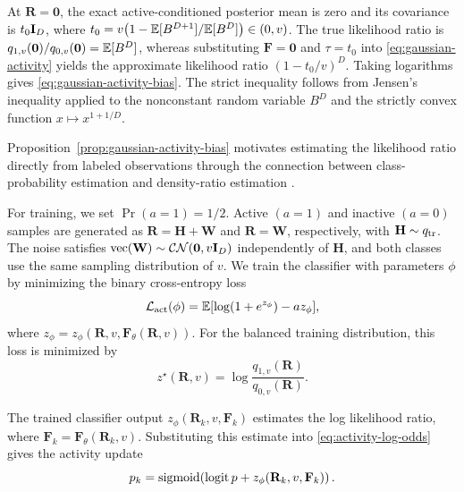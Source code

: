 \begin{IEEEproof}
At $\mathbf R=\mathbf0$, the exact active-conditioned posterior mean
is zero and its covariance is $t_0\mathbf{I}_D$, where
$t_0=v\bigl(1-\mathbb{E}[B^{D+1}]/\mathbb{E}[B^D]\bigr)\in(0,v)$.
The true likelihood ratio is
$q_{1,v}(\mathbf0)/q_{0,v}(\mathbf0)=\mathbb{E}[B^D]$, whereas
substituting $\mathbf F=\mathbf0$ and $\tau=t_0$ into
\eqref{eq:gaussian-activity} yields the approximate likelihood ratio
$(1-t_0/v)^D$. Taking logarithms gives
\eqref{eq:gaussian-activity-bias}.
The strict inequality follows from Jensen's inequality applied to the
nonconstant random variable $B^D$ and the strictly convex function
$x\mapsto x^{1+1/D}$.
\end{IEEEproof}

Proposition~\ref{prop:gaussian-activity-bias} motivates estimating the
likelihood ratio directly from labeled observations through the connection
between class-probability estimation and density-ratio estimation
\cite{menon2016}.

For training, we set $\Pr(a=1)=1/2$.
Active $(a=1)$ and inactive $(a=0)$ samples are generated as
$\mathbf R=\mathbf H+\mathbf W$ and $\mathbf R=\mathbf W$,
respectively, with $\mathbf H\sim q_{\rm tr}$.
The noise satisfies $\operatorname{vec}(\mathbf W)\sim\mathcal{CN}(\mathbf0,v\mathbf{I}_D)$
independently of $\mathbf H$, and both classes use the same sampling
distribution of $v$.
We train the classifier with parameters $\phi$ by minimizing the
binary cross-entropy loss
\begin{equation}
 \mathcal L_{\rm act}(\phi)=
 \mathbb{E}[\log(1+e^{z_\phi})-a z_\phi],
 \label{eq:classifier-loss}
\end{equation}
where $z_\phi=z_\phi(\mathbf R,v,\mathbf F_\theta(\mathbf R,v))$.
For the balanced training distribution, this loss is minimized by
\begin{equation}
 z^\star(\mathbf R,v)=
       \log\frac{q_{1,v}(\mathbf R)}{q_{0,v}(\mathbf R)}.
 \label{eq:ideal-logit}
\end{equation}

The trained classifier output $z_\phi(\mathbf R_k,v,\mathbf F_k)$
estimates the log likelihood ratio, where
$\mathbf F_k=\mathbf F_\theta(\mathbf R_k,v)$.
Substituting this estimate into \eqref{eq:activity-log-odds} gives the
activity update
\begin{equation}
 p_k=\operatorname{sigmoid}\!\left(\operatorname{logit} p+z_\phi(\mathbf R_k,v,\mathbf F_k)\right).
 \label{eq:activity-probability}
\end{equation}
